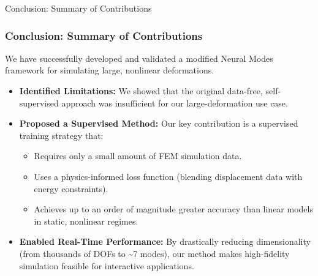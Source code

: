 \documentclass{beamer}
\begin{document}
\begin{frame}{Conclusion: Summary of Contributions}
    \frametitle{Conclusion: Summary of Contributions}
    
    We have successfully developed and validated a modified Neural Modes framework for simulating large, nonlinear deformations.
    
    \begin{itemize}
        \item \textbf{Identified Limitations:} We showed that the original data-free, self-supervised approach was insufficient for our large-deformation use case.
        \vspace{1em}
        
        \item \textbf{Proposed a Supervised Method:} Our key contribution is a supervised training strategy that:
        \begin{itemize}
            \item Requires only a small amount of FEM simulation data.
            \item Uses a physics-informed loss function (blending displacement data with energy constraints).
            \item Achieves up to an order of magnitude greater accuracy than linear models in static, nonlinear regimes.
        \end{itemize}
        \vspace{1em}
        
        \item \textbf{Enabled Real-Time Performance:} By drastically reducing dimensionality (from thousands of DOFs to \textasciitilde{}7 modes), our method makes high-fidelity simulation feasible for interactive applications.
    \end{itemize}
\end{frame}
\end{document}
